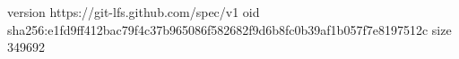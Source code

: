 version https://git-lfs.github.com/spec/v1
oid sha256:e1fd9ff412bac79f4c37b965086f582682f9d6b8fc0b39af1b057f7e8197512c
size 349692
